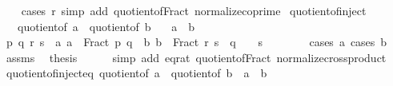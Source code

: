\begin{isabellebody}
%
\isadelimproof
\ \ %
\endisadelimproof
%
\isatagproof
{}\isamarkupfalse%
\ {\isacharparenleft}{\kern0pt}cases\ r{\isacharparenright}{\kern0pt}\ {\isacharparenleft}{\kern0pt}simp\ add{\isacharcolon}{\kern0pt}\ quotient{\isacharunderscore}{\kern0pt}of{\isacharunderscore}{\kern0pt}Fract\ normalize{\isacharunderscore}{\kern0pt}coprime{\isacharparenright}{\kern0pt}%
\endisatagproof
{\isafoldproof}%
%
\isadelimproof
\isanewline
%
\endisadelimproof
\isanewline
{}\isamarkupfalse%
\ quotient{\isacharunderscore}{\kern0pt}of{\isacharunderscore}{\kern0pt}inject{\isacharcolon}{\kern0pt}\isanewline
\ \ \ {\isachardoublequoteopen}quotient{\isacharunderscore}{\kern0pt}of\ a\ {\isacharequal}{\kern0pt}\ quotient{\isacharunderscore}{\kern0pt}of\ b{\isachardoublequoteclose}\isanewline
\ \ \ {\isachardoublequoteopen}a\ {\isacharequal}{\kern0pt}\ b{\isachardoublequoteclose}\isanewline
%
\isadelimproof
%
\endisadelimproof
%
\isatagproof
{}\isamarkupfalse%
\ {\isacharminus}{\kern0pt}\isanewline
\ \ \isamarkupfalse%
\ p\ q\ r\ s\ \ a{\isacharcolon}{\kern0pt}\ {\isachardoublequoteopen}a\ {\isacharequal}{\kern0pt}\ Fract\ p\ q{\isachardoublequoteclose}\ \ b{\isacharcolon}{\kern0pt}\ {\isachardoublequoteopen}b\ {\isacharequal}{\kern0pt}\ Fract\ r\ s{\isachardoublequoteclose}\ \ {\isachardoublequoteopen}q\ {\isachargreater}{\kern0pt}\ {}{\isachardoublequoteclose}\ \ {\isachardoublequoteopen}s\ {\isachargreater}{\kern0pt}\ {}{\isachardoublequoteclose}\isanewline
\ \ \ \ \isamarkupfalse%
\ {\isacharparenleft}{\kern0pt}cases\ a{\isacharcomma}{\kern0pt}\ cases\ b{\isacharparenright}{\kern0pt}\isanewline
\ \ \isamarkupfalse%
\ assms\ \isamarkupfalse%
\ {\isacharquery}{\kern0pt}thesis\isanewline
\ \ \ \ \isamarkupfalse%
\ {\isacharparenleft}{\kern0pt}simp\ add{\isacharcolon}{\kern0pt}\ eq{\isacharunderscore}{\kern0pt}rat\ quotient{\isacharunderscore}{\kern0pt}of{\isacharunderscore}{\kern0pt}Fract\ normalize{\isacharunderscore}{\kern0pt}crossproduct{\isacharparenright}{\kern0pt}\isanewline
{}\isamarkupfalse%
%
\endisatagproof
{\isafoldproof}%
%
\isadelimproof
\isanewline
%
\endisadelimproof
\isanewline
{}\isamarkupfalse%
\ quotient{\isacharunderscore}{\kern0pt}of{\isacharunderscore}{\kern0pt}inject{\isacharunderscore}{\kern0pt}eq{\isacharcolon}{\kern0pt}\ {\isachardoublequoteopen}quotient{\isacharunderscore}{\kern0pt}of\ a\ {\isacharequal}{\kern0pt}\ quotient{\isacharunderscore}{\kern0pt}of\ b\ {\isasymlongleftrightarrow}\ a\ {\isacharequal}{\kern0pt}\ b{\isachardoublequoteclose}\isanewline

\end{isabellebody}
